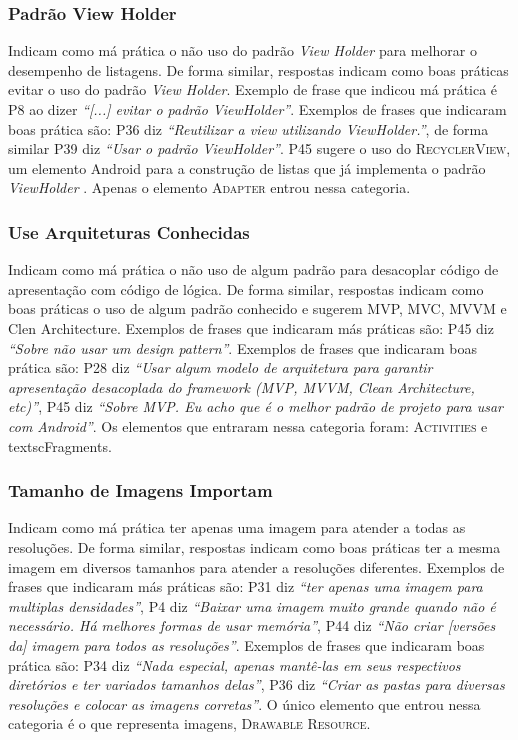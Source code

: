 \subsubsection{Padrão View Holder}
Indicam como má prática o não uso do padrão \textit{View Holder} \cite{AluraViewHolder} para melhorar o desempenho de listagens. De forma similar, respostas indicam como boas práticas evitar o uso do padrão \textit{View Holder}. Exemplo de frase que indicou má prática é P8 ao dizer \textit{``[...] evitar o padrão ViewHolder''}. Exemplos de frases que indicaram boas prática são: P36 diz \textit{``Reutilizar a view utilizando ViewHolder.''}, de forma similar P39 diz \textit{``Usar o padrão ViewHolder''}. P45 sugere o uso do \textsc{RecyclerView}, um elemento Android para a construção de listas que já implementa o padrão \textit{ViewHolder} \cite{AluraViewHolder}. Apenas o elemento \textsc{Adapter} entrou nessa categoria. 

\subsubsection{Use Arquiteturas Conhecidas}
Indicam como má prática o não uso de algum padrão para desacoplar código de apresentação com código de lógica. De forma similar, respostas indicam como boas práticas o uso de algum padrão conhecido e sugerem MVP, MVC, MVVM e Clen Architecture. Exemplos de frases que indicaram más práticas são: P45 diz \textit{``Sobre não usar um design pattern''}. Exemplos de frases que indicaram boas prática são: P28 diz \textit{``Usar algum modelo de arquitetura para garantir apresentação desacoplada do framework (MVP, MVVM, Clean Architecture, etc)''}, P45 diz \textit{``Sobre MVP. Eu acho que é o melhor padrão de projeto para usar com Android''}. Os elementos que entraram nessa categoria foram: \textsc{Activities} e textsc{Fragments}. 

\subsubsection{Tamanho de Imagens Importam}
Indicam como má prática ter apenas uma imagem para atender a todas as resoluções. De forma similar, respostas indicam como boas práticas ter a mesma imagem em diversos tamanhos para atender a resoluções diferentes. Exemplos de frases que indicaram más práticas são: P31 diz \textit{``ter apenas uma imagem para multiplas densidades''}, P4 diz \textit{``Baixar uma imagem muito grande quando não é necessário. Há melhores formas de usar memória''}, P44 diz \textit{``Não criar [versões da] imagem para todos as resoluções''}. Exemplos de frases que indicaram boas prática são: P34 diz \textit{``Nada especial, apenas mantê-las em seus respectivos diretórios e ter variados tamanhos delas''}, P36 diz \textit{``Criar as pastas para diversas resoluções e colocar as imagens corretas''}. O único elemento que entrou nessa categoria é o que representa imagens, \textsc{Drawable Resource}.

